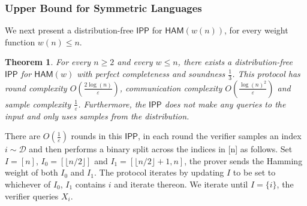 \documentclass[10pt,a4paper]{article}
\newtheorem{theorem}{Theorem}[section]
\newcommand{\HAM}{\mathsf{HAM}}
\newcommand{\IPP}{\mathsf{IPP}}
\begin{document}
\subsubsection{Upper Bound for Symmetric Languages}
\label{sec:hamming}
We next present a distribution-free $\IPP$ for $\HAM(w(n))$, for every weight function $w(n) \leq n$. 
\begin{theorem}
\label{thm:ham_dfipp}
For every $n \geq 2$ and every $w \leq n$, there exists a distribution-free $\IPP$ for $\HAM(w)$ with perfect completeness and soundness $\frac{1}{3}$. This protocol has round complexity $O\left(\frac{2\log(n)}{\varepsilon}\right)$, communication complexity $O \left( \frac{\log(n)^{2}}{\varepsilon} \right)$ and sample complexity $\frac{1}{\varepsilon}$. Furthermore, the $\IPP$ does not make any queries to the input and only uses samples from the distribution.
\end{theorem}
 
There are $O\left(\frac{1}{\varepsilon}\right)$ rounds in this $\IPP$, in each round the verifier samples an index $i\sim \mathcal{D}$ and then performs a binary split across the indices in [n] as follows. Set $I=[n]$, $I_{0}=[\lfloor n/2\rfloor ]$ and $I_{1}=[\lfloor n/2 \rfloor + 1,n]$, the prover sends the Hamming weight of both $I_{0}$ and $I_{1}$. The protocol iterates by updating $I$ to be set to whichever of $I_{0}$, $I_{1}$ contains $i$ and iterate thereon. We iterate until $I=\{i\}$, the verifier queries $X_{i}$. 
\end{document}

